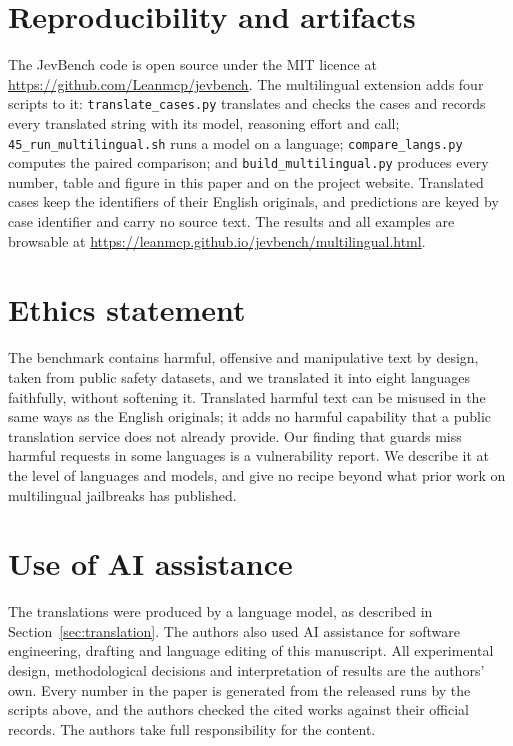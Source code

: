 \section{Reproducibility and artifacts}

The JevBench code is open source under the MIT licence at
\url{https://github.com/Leanmcp/jevbench}. The multilingual extension adds four
scripts to it: \texttt{translate\_cases.py} translates and checks the cases and
records every translated string with its model, reasoning effort and call;
\texttt{45\_run\_multilingual.sh} runs a model on a language;
\texttt{compare\_langs.py} computes the paired comparison; and
\texttt{build\_multilingual.py} produces every number, table and figure in this
paper and on the project website. Translated cases keep the identifiers of their
English originals, and predictions are keyed by case identifier and carry no
source text. The results and all examples are browsable at
\url{https://leanmcp.github.io/jevbench/multilingual.html}.

\section*{Ethics statement}

The benchmark contains harmful, offensive and manipulative text by design,
taken from public safety datasets, and we translated it into eight languages
faithfully, without softening it. Translated harmful text can be misused in the
same ways as the English originals; it adds no harmful capability that a public
translation service does not already provide. Our finding that guards miss
harmful requests in some languages is a vulnerability report. We describe it at
the level of languages and models, and give no recipe beyond what prior work on
multilingual jailbreaks has published.

\section*{Use of AI assistance}

The translations were produced by a language model, as described in
Section~\ref{sec:translation}. The authors also used AI assistance for software
engineering, drafting and language editing of this manuscript. All experimental
design, methodological decisions and interpretation of results are the
authors' own. Every number in the paper is generated from the released runs by
the scripts above, and the authors checked the cited works against their
official records. The authors take full responsibility for the content.
